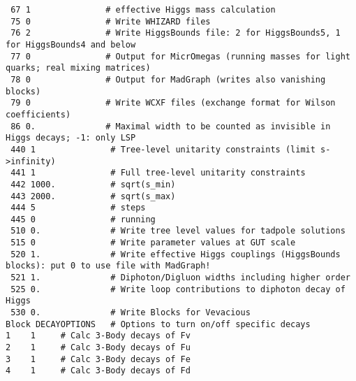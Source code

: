 \begin{lstlisting}
 67 1               # effective Higgs mass calculation 
 75 0               # Write WHIZARD files 
 76 2               # Write HiggsBounds file: 2 for HiggsBounds5, 1 for HiggsBounds4 and below   
 77 0               # Output for MicrOmegas (running masses for light quarks; real mixing matrices)   
 78 0               # Output for MadGraph (writes also vanishing blocks)   
 79 0               # Write WCXF files (exchange format for Wilson coefficients) 
 86 0.              # Maximal width to be counted as invisible in Higgs decays; -1: only LSP 
 440 1               # Tree-level unitarity constraints (limit s->infinity) 
 441 1               # Full tree-level unitarity constraints 
 442 1000.           # sqrt(s_min)   
 443 2000.           # sqrt(s_max)   
 444 5               # steps   
 445 0               # running   
 510 0.              # Write tree level values for tadpole solutions 
 515 0               # Write parameter values at GUT scale 
 520 1.              # Write effective Higgs couplings (HiggsBounds blocks): put 0 to use file with MadGraph! 
 521 1.              # Diphoton/Digluon widths including higher order 
 525 0.              # Write loop contributions to diphoton decay of Higgs 
 530 0.              # Write Blocks for Vevacious 
Block DECAYOPTIONS   # Options to turn on/off specific decays 
1    1     # Calc 3-Body decays of Fv 
2    1     # Calc 3-Body decays of Fu 
3    1     # Calc 3-Body decays of Fe 
4    1     # Calc 3-Body decays of Fd 
\end{lstlisting}
